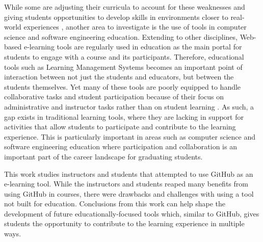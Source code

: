 While some are adjusting their curricula to account for these weaknesses \cite{jazayeri2004education} and giving students opportunities to develop skills in environments closer to real-world experiences \cite{coleman2012collaboration}, another area to investigate is the use of tools in computer science and software engineering education. Extending to other disciplines, Web-based e-learning tools are regularly used in education as the main portal for students to engage with a course and its participants. Therefore, educational tools such as Learning Management Systems becomes an important point of interaction between not just the students and educators, but between the students themselves. Yet many of these tools are poorly equipped to handle collaborative tasks and student participation because of their focus on administrative and instructor tasks rather than on student learning \cite{mcloughlin2007social}. As such, a gap exists in traditional learning tools, where they are lacking in support for activities that allow students to participate and contribute to the learning experience. This is particularly important in areas such as computer science and software engineering education where participation and collaboration is an important part of the career landscape for graduating students.



This work studies instructors and students that attempted to use GitHub as an e-learning tool. While the instructors and students reaped many benefits from using GitHub in courses, there were drawbacks and challenges with using a tool not built for education. Conclusions from this work can help shape the development of future educationally-focused tools which, similar to GitHub, gives students the opportunity to contribute to the learning experience in multiple ways.

